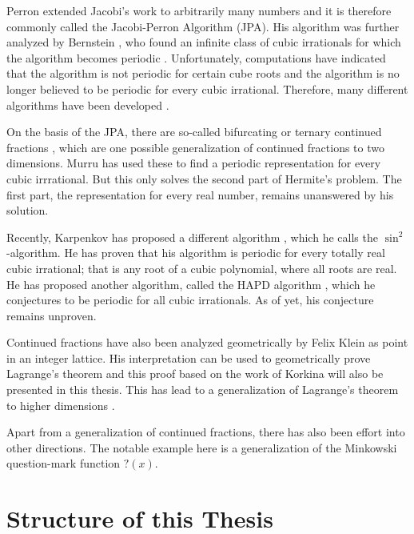 Perron extended Jacobi's work to arbitrarily many numbers \cite{Perron07}
and it is therefore commonly called the Jacobi-Perron Algorithm (JPA).
His algorithm was further analyzed by Bernstein \cite{Bernstein71},
who found an infinite class of cubic irrationals for which the algorithm
becomes periodic \cite{Bernstein65, Bernstein64A, Bernstein64B}.
Unfortunately, computations have indicated that the algorithm is not periodic
for certain cube roots \cite{Elsner67}
and the algorithm is no longer believed to be periodic for every cubic irrational.
Therefore, many different algorithms have been developed \cite{Schweiger00,Hendy81,Schweiger13}.

On the basis of the JPA,
there are so-called bifurcating or ternary continued fractions \cite{Gupta00},
which are one possible generalization of continued fractions to two dimensions.
Murru has used these to find a periodic representation for every cubic irrrational.
But this only solves the second part of Hermite's problem.
The first part, the representation for every real number, remains unanswered by his solution.

Recently, Karpenkov has proposed a different algorithm \cite{Karpenkov21}, which he calls the $\sin^2$-algorithm.
He has proven that his algorithm is periodic for every totally real cubic
irrational; that is any root of a cubic polynomial, where all roots are real.
He has proposed another algorithm, called the HAPD algorithm \cite{Karpenkov24}, which he
conjectures to be periodic for all cubic irrationals.
As of yet, his conjecture remains unproven.

Continued fractions have also been analyzed geometrically by Felix Klein \cite{Klein95}
as point in an integer lattice.
His interpretation can be used to geometrically prove Lagrange's theorem
and this proof based on the work of Korkina \cite{Korkina96} will also be
presented in this thesis.
This has lead to a generalization of Lagrange's theorem to higher dimensions \cite{German08}.

Apart from a generalization of continued fractions,
there has also been effort into other directions.
The notable example here is a generalization of the Minkowski question-mark function $?(x)$.

\section{Structure of this Thesis}

